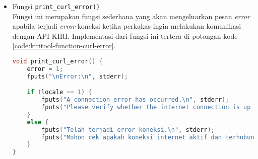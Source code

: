 \begin{itemize}[listparindent=\parindent]
\begin{lstlisting}[language=C, caption=Implementasi fungsi execute\textunderscore curl(), label=code:kiritool-function-curl-execute]
    curl_global_init(CURL_GLOBAL_DEFAULT);
    curl = curl_easy_init();

    if (curl) {
        curl_easy_setopt(curl, CURLOPT_URL, URL);
        curl_easy_setopt(curl, CURLOPT_WRITEFUNCTION, write_memalloc);
        curl_easy_setopt(curl, CURLOPT_WRITEDATA, (void *)&responsedata);
        response = curl_easy_perform(curl);
        if (response != CURLE_OK) {
            print_curl_error();
        }

        switch (mode) {
            case 2: // searchplace
                write_searchplace();
                break;
            
            case 3: // findroute
                write_findroute();
                break;

            case 4: // directroute
                if (step == 0 || step == 1) { // search start and finish
                    write_searchplace_noreturns();
                }
                else if (step == 2) { // findroute
                    write_findroute();
                }
                break;

            default:
                break;
        }

        curl_easy_cleanup(curl);
    }

    curl_global_cleanup();
}
	\end{lstlisting}
	
	\item Fungsi \verb|print_curl_error()| \\
	Fungsi ini merupakan fungsi sederhana yang akan mengeluarkan pesan \textit{error} apabila terjadi \textit{error} koneksi ketika perkakas ingin melakukan komunikasi dengan API KIRI. Implementasi dari fungsi ini tertera di potongan kode \ref{code:kiritool-function-curl-error}.
	
	\begin{lstlisting}[language=C, caption=Implementasi fungsi print\textunderscore curl\textunderscore error(), label=code:kiritool-function-curl-error]
void print_curl_error() {
    error = 1;
    fputs("\nError:\n", stderr);

    if (locale == 1) {
        fputs("A connection error has occurred.\n", stderr);
        fputs("Please verify whether the internet connection is up and running.\n", stderr);
    }
    else {
        fputs("Telah terjadi error koneksi.\n", stderr);
        fputs("Mohon cek apakah koneksi internet aktif dan terhubung dengan baik.\n", stderr);
    }
}
	\end{lstlisting}
	

\end{itemize}
